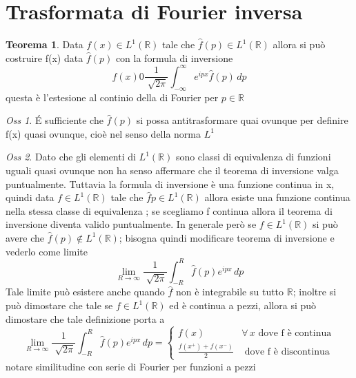 \documentclass[a4paper,11pt]{report}
\theoremstyle{remark}
\newtheorem*{oss}{Oss}
\theoremstyle{definition}
\newtheorem*{teo}{Teorema}
\newcommand{\R}{\mathbb{R}}
\begin{document}
\section{Trasformata di Fourier inversa}

\begin{teo}
	Data $f(x)\in L^1(\R)$ tale che $\hat{f}(p) \in L^1(\R)$ allora si può costruire f(x) data $\hat{f}(p)$ con la formula di inversione
	\begin{equation*}
		f(x) 0 \frac{1}{\sqrt[]{2\pi}} \int_{-\infty}^\infty e^{ipx}\hat{f}(p) \, dp
	\end{equation*}
	questa è l'estesione al continio della di Fourier per $p\in\R$
\end{teo}

\begin{oss}
	\'E sufficiente che $\hat{f}(p)$ si possa antitrasformare quai ovunque per definire f(x) quasi ovunque, cioè nel senso della norma $L^1$
\end{oss}

\begin{oss}
	Dato che gli elementi di $L^1(\R)$ sono classi di equivalenza di funzioni uguali quasi ovunque non ha senso affermare che il teorema di inversione valga puntualmente. Tuttavia la formula di inversione è una funzione continua in x, quindi data $f\in L^1(\R)$ tale che $\hat{f}p \in L^1(\R)$ allora esiste una funzione continua nella stessa classe di equivalenza ; se scegliamo f continua allora il teorema di inversione diventa valido puntualmente. In generale però se $ f \in L^1(\R)$ si può avere che $\hat{f}(p) \not\in L^1(\R)$; bisogna quindi modificare teorema di inversione e vederlo come limite
	\begin{equation*}
		\lim_{R\to\infty} \frac{1}{\sqrt[]{2\pi}} \int_{-R}^R \hat{f}(p)e^{ipx} \, dp
	\end{equation*}
	Tale limite può esistere anche quando $\hat{f}$ non è integrabile su tutto $\R$; inoltre si può dimostare che tale se $f \in L^1(\R)$ ed è continua a pezzi, allora si può dimostare che tale definizione porta a 
	\begin{equation*}
		\lim_{R\to\infty} \frac{1}{\sqrt[]{2\pi}} \int_{-R}^R \hat{f}(p) e^{ipx} \, dp = \begin{cases}
			f(x) & \forall\, x \text{ dove f è continua} \\
			\frac{f(x^+)+f(x^-)}{2} & \text{ dove f è discontinua}
		\end{cases}
	\end{equation*}
	notare similitudine con serie di Fourier per funzioni a pezzi
\end{oss}
\end{document}
